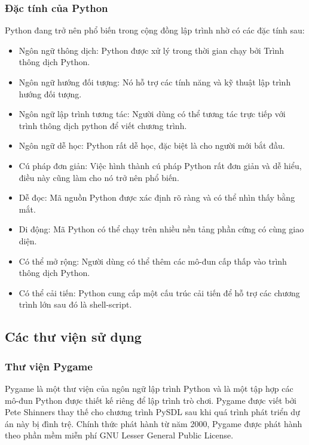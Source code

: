 \documentclass[a4paper]{article}
\begin{document}
\subsubsection{Đặc tính của Python}
    \hspace*{0.5cm}\Large Python đang trở nên phổ biến trong cộng đồng lập trình nhờ có các đặc tính sau:
\begin{itemize}
    \item Ngôn ngữ thông dịch: Python được xử lý trong thời gian chạy bởi Trình thông dịch Python.
    \item Ngôn ngữ hướng đối tượng: Nó hỗ trợ các tính năng và kỹ thuật lập trình hướng đối tượng.
    \item Ngôn ngữ lập trình tương tác: Người dùng có thể tương tác trực tiếp với trình thông dịch python để viết chương trình.
    \item Ngôn ngữ dễ học: Python rất dễ học, đặc biệt là cho người mới bắt đầu.
    \item Cú pháp đơn giản: Việc hình thành cú pháp Python rất đơn giản và dễ hiểu, điều này cũng làm cho nó trở nên phổ biến.
    \item Dễ đọc: Mã nguồn Python được xác định rõ ràng và có thể nhìn thấy bằng mắt.
    \item Di động: Mã Python có thể chạy trên nhiều nền tảng phần cứng có cùng giao diện.
    \item Có thể mở rộng: Người dùng có thể thêm các mô-đun cấp thấp vào trình thông dịch Python.
    \item Có thể cải tiến: Python cung cấp một cấu trúc cải tiến để hỗ trợ các chương trình lớn sau đó là shell-script.
    
\end{itemize}
\subsection{Các thư viện sử dụng}
\subsubsection{Thư viện Pygame}
    \hspace*{0.5cm} Pygame là một thư viện của ngôn ngữ lập trình Python và là một tập hợp các mô-đun Python được thiết kế riêng để lập trình trò chơi. Pygame được viết bởi Pete Shinners thay thế cho chương trình PySDL sau khi quá trình phát triển dự án này bị đình trệ. Chính thức phát hành từ năm 2000, Pygame được phát hành theo phần mềm miễn phí GNU Lesser General Public License.
\end{document}
